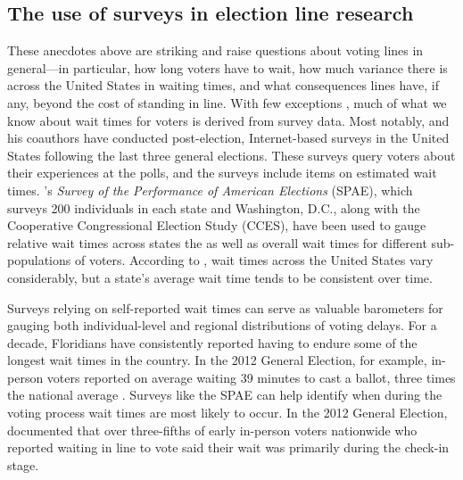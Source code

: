 \documentclass[12pt,titlepage]{article}
\begin{document}

\subsection*{The use of surveys in election line research}

These anecdotes above are striking and raise questions about voting
lines in general---in particular, how long voters have to wait, how
much variance there is across the United States in waiting times, and
what consequences lines have, if any, beyond the cost of standing in
line.  With few exceptions \citep[e.g.,][]{spencermarkovits:renege,
  herronsmith:hanoverstudy, pettigrew:longlinesminorityprecincts},
much of what we know about wait times for voters is derived from
survey data. Most notably, \citet{stewart:waitingtovote2012} and his
coauthors have conducted post-election, Internet-based surveys in the
United States following the last three general elections.  These
surveys query voters about their experiences at the polls, and the
surveys include items on estimated wait times.
\citeauthor{stewart:waitingtovote2012}'s \emph{Survey of the
  Performance of American Elections} (SPAE), which surveys 200
individuals in each state and Washington, D.C., along with the
Cooperative Congressional Election Study (CCES), have been used to
gauge relative wait times across states the as well as overall wait
times for different sub-populations of voters.  According to
\citeauthor{stewart:waitingtovote2012}, wait times across the United
States vary considerably, but a state's average wait time tends to be
consistent over time.

Surveys relying on self-reported wait times can serve as valuable
barometers for gauging both individual-level and regional
distributions of voting delays.  For a decade, Floridians have
consistently reported having to endure some of the longest wait times
in the country. In the 2012 General Election, for example, in-person
voters reported on average waiting 39 minutes to cast a ballot, three
times the national average \citep{stewart:waitingtovote2012}.  Surveys
like the SPAE can help identify when during the voting process wait
times are most likely to occur.  In the 2012 General Election,
\citeauthor{stewart:waitingtovote2012} documented that over
three-fifths of early in-person voters nationwide who reported waiting
in line to vote said their wait was primarily during the check-in
stage.
\end{document}
